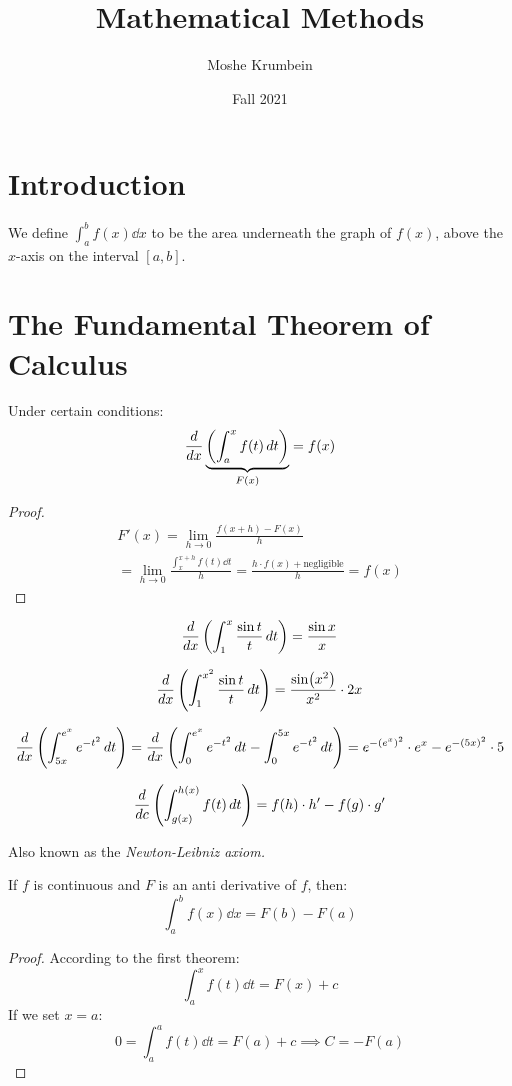 \documentclass[00_complete]{subfiles}
\title{Mathematical Methods}
\author{Moshe Krumbein}
\date{Fall 2021}
\begin{document}

\section{Introduction}

We define $\int_{a}^{b}f(x)\dd{x}$ to be the area underneath the graph of
$f(x)$, above the $x$-axis on the interval $[a,b]$.

\section{The Fundamental Theorem of Calculus}
\begin{definition}
    Under certain conditions:
    $$\dv{x}\underbrace{\left(\int_{a}^{x}f(t)\dd{t}\right)}_{F(x)} = f(x)$$
    \begin{proof}
        $$
        \begin{gathered}
            F'(x)= \lim\limits_{h \to 0} \frac{f(x+h)-F(x)}{h} \\
            = \lim\limits_{h \to 0} \frac{\int_{x}^{x+h}f(t)\dd{t}}{h} =
            \frac{h\cdot f(x) + \text{negligible}}{h} = f(x)
        \end{gathered}
        $$
    \end{proof}
\end{definition}
\begin{example}
    $$
        \dv{x}\left(\int_{1}^{x}\frac{\sin t}{t}\dd{t}\right) = \frac{\sin x}{x}
    $$
\end{example}
\begin{example}
    $$
        \dv{x}\left(\int_{1}^{x^2}\frac{\sin t}{t}\dd{t}\right) = \frac{\sin
        (x^2)}{x^2}\cdot 2x
    $$
\end{example}
\begin{example}
    $$
        \dv{x}\left(\int_{5x}^{e^x} e^{-t^2}\dd{t}\right) =
        \dv{x}\left(\int_{0}^{e^x}e^{-t^2}\dd{t}-\int_{0}^{5x}e^{-t^2}\dd{t}\right)
        = e^{-(e^x)^2}\cdot e^x - e^{-(5x)^2}\cdot 5
    $$
\end{example}
\begin{definition}
    $$\dv{c}\left(\int_{g(x)}^{h(x)}f(t)\dd{t}\right)=f(h)\cdot h'-f(g)\cdot g'$$
\end{definition}
\begin{definition}
    Also known as the \emph{Newton-Leibniz axiom.}

    If $f$ is continuous and $F$ is an anti derivative of $f$, then:
    $$\int_{a}^{b}f(x)\dd{x}=F(b)-F(a)$$
    \begin{proof}
        According to the first theorem:
        $$\int_{a}^{x}f(t)\dd{t}=F(x)+c$$
        If we set $x=a$:
        $$0=\int_{a}^{a}f(t)\dd{t}=F(a)+c \implies C = -F(a)$$
    \end{proof}
\end{definition}
\end{document}
